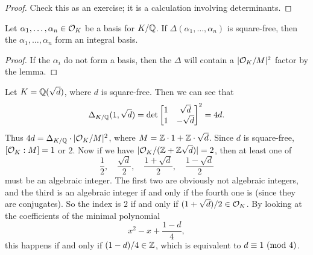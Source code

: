 \begin{proof}
  Check this as an exercise; it is a calculation
  involving determinants.
\end{proof}

\begin{corollary}
  Let $\alpha_1, \dots, \alpha_n \in \mathcal{O}_K$ be a
  basis for $K / \mathbb{Q}$. If
  $\Delta(\alpha_1, \dots, \alpha_n)$ is
  square-free, then the $\alpha_1, \dots, \alpha_n$ form
  an integral basis.
\end{corollary}

\begin{proof}
  If the $\alpha_i$ do not form a basis, then
  the $\Delta$ will contain a
  $|\mathcal{O}_K / M|^2$ factor by the lemma.
\end{proof}

\begin{example}
  Let $K = \mathbb{Q}(\sqrt{d})$, where $d$ is square-free.
  Then we can see that
  \[
    \Delta_{K / \mathbb{Q}}(1, \sqrt{d}) =
    \det
    \begin{bmatrix}
      1 & \sqrt{d} \\ 1 & -\sqrt{d}
    \end{bmatrix}^2
    = 4d.
  \]
  Thus $4d = \Delta_{K / \mathbb{Q}} \cdot |\mathcal{O}_K / M|^2$, where
  $M = \mathbb{Z} \cdot 1 + \mathbb{Z} \cdot \sqrt{d}$. Since $d$ is
  square-free, $[\mathcal{O}_K : M] = 1$ or $2$. Now if
  we have $|\mathcal{O}_K / (\mathbb{Z} + \mathbb{Z} \sqrt{d})| = 2$, then at
  least one of
  \[
    \frac{1}{2}, \quad \frac{\sqrt{d}}{2}, \quad
    \frac{1 + \sqrt{d}}{2}, \quad \frac{1 - \sqrt{d}}{2}
  \]
  must be an algebraic integer. The first two are
  obviously not algebraic integers, and the third is
  an algebraic integer if and only if the fourth one
  is (since they are conjugates). So the index is $2$
  if and only if $(1 + \sqrt{d}) / 2 \in \mathcal{O}_K$.
  By looking at the coefficients of the minimal
  polynomial
  \[
    x^2 - x + \frac{1 - d}{4},
  \]
  this happens if and only if $(1 - d) / 4 \in \mathbb{Z}$,
  which is equivalent to $d \equiv 1 \ (\mathrm{mod}\ 4)$.
\end{example}
